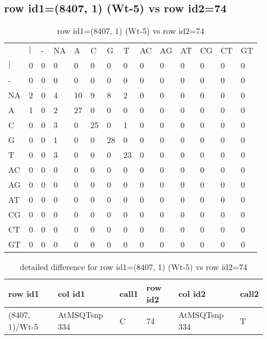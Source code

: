 \subsection{row id1=(8407, 1) (Wt-5) vs row id2=74}
\begin{center}
\begin{longtable}{|l|l|l|l|l|l|l|l|l|l|l|l|l|l|}
\caption{row id1=(8407, 1) (Wt-5) vs row id2=74} \label{table_dm676}\\
\hline
\\
\hline
&$|$&-&NA&A&C&G&T&AC&AG&AT&CG&CT&GT\\
$|$&0&0&0&0&0&0&0&0&0&0&0&0&0\\
-&0&0&0&0&0&0&0&0&0&0&0&0&0\\
NA&2&0&4&10&9&8&2&0&0&0&0&0&0\\
A&1&0&2&27&0&0&0&0&0&0&0&0&0\\
C&0&0&3&0&25&0&1&0&0&0&0&0&0\\
G&0&0&1&0&0&28&0&0&0&0&0&0&0\\
T&0&0&3&0&0&0&23&0&0&0&0&0&0\\
AC&0&0&0&0&0&0&0&0&0&0&0&0&0\\
AG&0&0&0&0&0&0&0&0&0&0&0&0&0\\
AT&0&0&0&0&0&0&0&0&0&0&0&0&0\\
CG&0&0&0&0&0&0&0&0&0&0&0&0&0\\
CT&0&0&0&0&0&0&0&0&0&0&0&0&0\\
GT&0&0&0&0&0&0&0&0&0&0&0&0&0\\
\hline
\end{longtable}
\end{center}

\begin{center}
\begin{longtable}{|l|l|l|l|l|l|}
\caption{detailed difference for row id1=(8407, 1) (Wt-5) vs row id2=74} \label{table_dm677}\\
\hline
row id1&col id1&call1&row id2&col id2&call2\\
\hline
(8407, 1)/Wt-5&AtMSQTsnp 334&C&74&AtMSQTsnp 334&T\\
\hline
\end{longtable}
\end{center}

